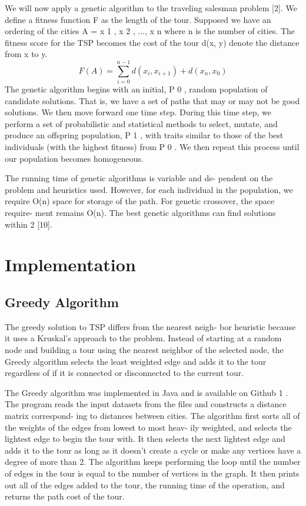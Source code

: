 \documentclass[10pt,twocolumn,letterpaper]{article}
\begin{document}
We will now apply a genetic algorithm to the traveling
salesman problem [2]. We define a fitness function F as the
length of the tour. Supposed we have an ordering of the
cities A = {x 1 , x 2 , ..., x n } where n is the number of cities.
The fitness score for the TSP becomes the cost of the tour
d(x, y) denote the distance from x to y.
\begin{equation}
	F(A) =\sum_{i=0}^{n-1} d(x_i , x_{i+1}) + d(x_n , x_0 )
\end{equation}
The genetic algorithm begins with an initial, P 0 , random
population of candidate solutions. That is, we have a set of
paths that may or may not be good solutions. We then move
forward one time step. During this time step, we perform a
set of probabilistic and statistical methods to select, mutate,
and produce an offspring population, P 1 , with traits similar
to those of the best individuals (with the highest fitness)
from P 0 . We then repeat this process until our population
becomes homogeneous.

The running time of genetic algorithms is variable and de-
pendent on the problem and heuristics used. However, for
each individual in the population, we require O(n) space for
storage of the path. For genetic crossover, the space require-
ment remains O(n). The best genetic algorithms can find
solutions within 2%
[10].

\section{Implementation}
\subsection{Greedy Algorithm}
The greedy solution to TSP differs from the nearest neigh-
bor heuristic because it uses a Kruskal’s approach to the
problem. Instead of starting at a random node and building
a tour using the nearest neighbor of the selected node, the
Greedy algorithm selects the least weighted edge and adds
it to the tour regardless of if it is connected or disconnected
to the current tour.

The Greedy algorithm was implemented in Java and is
available on Github 1 . The program reads the input datasets
from the files and constructs a distance matrix correspond-
ing to distances between cities. The algorithm first sorts
all of the weights of the edges from lowest to most heav-
ily weighted, and selects the lightest edge to begin the tour
with. It then selects the next lightest edge and adds it to
the tour as long as it doesn’t create a cycle or make any
vertices have a degree of more than 2. The algorithm keeps
performing the loop until the number of edges in the tour is
equal to the number of vertices in the graph. It then prints
out all of the edges added to the tour, the running time of
the operation, and returns the path cost of the tour.
\end{document}
